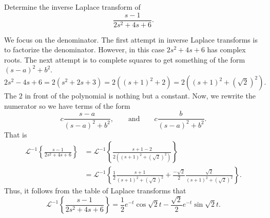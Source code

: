 \documentclass[11pt]{article}
\begin{document}
\newpage




\begin{problem}
Determine the inverse Laplace transform of
\[\frac{s-1}{2s^{2}+4s+6}.\]
\end{problem}
\begin{solution}
We focus on the denominator. The first attempt in inverse Laplace transforms is to factorize the denominator. However, in this case $2s^{2}+4s+6$ has complex roots. The next attempt is to complete squares to get something of the form $(s-a)^{2}+b^{2}$.
\[2s^{2}-4s +6 = 2(s^{2}+2s+3)=2((s+1)^{2}+2)=2((s+1)^{2}+(\sqrt{2})^{2}).\]
The $2$ in front of the polynomial is nothing but a constant. 
Now, we rewrite the numerator so we have terms of the form \[c\frac{s-a}{(s-a)^{2}+b^{2}},\qquad\text{and}\qquad c\frac{b}{(s-a)^{2}+b^{2}}.\]
That is
\begin{align*}
\mathcal{L}^{-1}\left\{\frac{s-1}{2s^{2}+4s+6}\right\}&= \mathcal{L}^{-1}\left\{\frac{s+1-2}{2((s+1)^{2}+(\sqrt{2})^{2})}\right\}\\
&=\mathcal{L}^{-1}\left\{\frac{1}{2}\frac{s+1}{(s+1)^{2}+(\sqrt{2})^{2}}+ \frac{-\sqrt{2}}{2}\frac{\sqrt{2}}{(s+1)^{2}+(\sqrt{2})^{2}}\right\}.
\end{align*}
Thus, it follows from the table of Laplace transforms that
\[\boxed{\mathcal{L}^{-1}\left\{\frac{s-1}{2s^{2}+4s+6}\right\}=\frac{1}{2}e^{-t}\cos\sqrt{2}t-\frac{\sqrt{2}}{2}e^{-t}\sin\sqrt{2}t}.\]
\end{solution}
\end{document}
